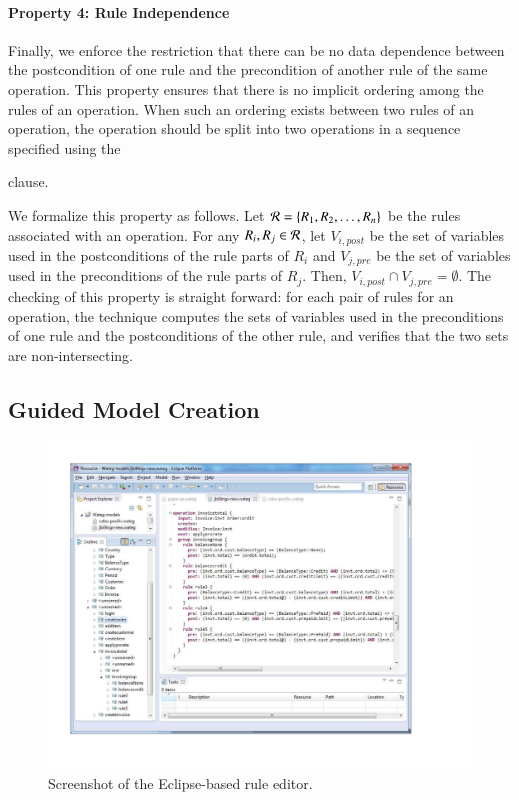 \vspace*{-5pt}
\paragraph*{Property 4: Rule Independence}
Finally, we enforce the restriction that there can be no data dependence between
the postcondition of one rule and the precondition of another rule of the same
operation. This property ensures that there is no implicit ordering among the
rules of an operation. When such an ordering exists between two rules of an
operation, the operation should be split into two operations in a sequence
specified using the \subject{next} clause.

We formalize this property as follows. Let ${\cal R} = \{R_1, R_2, \ldots,
R_n\}$ be the rules associated with an operation. For any $R_i, R_j \in {\cal
  R}$, let $V_{i, \mathit{post}}$ be the set of variables used in the
postconditions of the rule parts of $R_i$ and $V_{j, \mathit{pre}}$ be the set
of variables used in the preconditions of the rule parts of $R_j$. Then, $V_{i,
  \mathit{post}} \cap V_{j, \mathit{pre}} = \emptyset$. The checking of this
property is straight forward: for each pair of rules for an operation, the
technique computes the sets of variables used in the preconditions of one rule
and the postconditions of the other rule, and verifies that the two sets are
non-intersecting.

\subsection{Guided Model Creation}

\begin{figure}[t]
\centering
\includegraphics[trim=43 65 114 36,clip,width=.9\columnwidth]{figs/rule-editor.pdf}
\vspace*{-13pt}
\caption{Screenshot of the Eclipse-based rule editor.}
\vspace*{-0pt}
\label{fig:rule-editor}
\end{figure}

